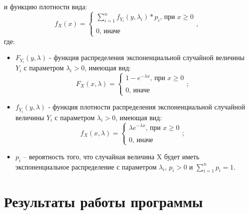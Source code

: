 и функцию плотности вида:
\begin{equation}
	f_{X}(x) = \begin{cases}
		\sum_{i=1}^n f_{Y_{i}}(y, \lambda_{i}) * p_{i} \text{, при } x \geq 0\\\\
		0 \text{, иначе }
	\end{cases},
\end{equation}
где:
\begin{itemize}[label=---]
	\item $F_{Y_{i}}(y, \lambda)$ - функция распределения экспоненциальной случайной величины $Y_{i}$ с параметром $\lambda_{i} > 0$, имеющая вид:
	\begin{equation}
		F_{X}(x, \lambda) = \begin{cases}
			1 - e^{-\lambda x} \text{, при } x \geq 0\\\\
			0 \text{, иначе }
		\end{cases};
	\end{equation}
	\item $f_{Y_{i}}(y, \lambda)$ - функция плотности распределения экспоненциальной случайной величины $Y_{i}$ с параметром $\lambda_{i} > 0$, имеющая вид:
	\begin{equation}
		f_{X}(x, \lambda) = \begin{cases}
			\lambda e^{-\lambda x} \text{, при } x \geq 0\\\\
			0 \text{, иначе }
		\end{cases};
	\end{equation}
	
	\item $p_{i}$ -- вероятность того, что случайная величина X будет иметь экспоненциальное распределение с параметром $\lambda_{i}$, $p_{i} > 0$ и $\sum_{i=1}^n p_{i} = 1$.
\end{itemize}

\clearpage

\section*{Результаты работы программы}

